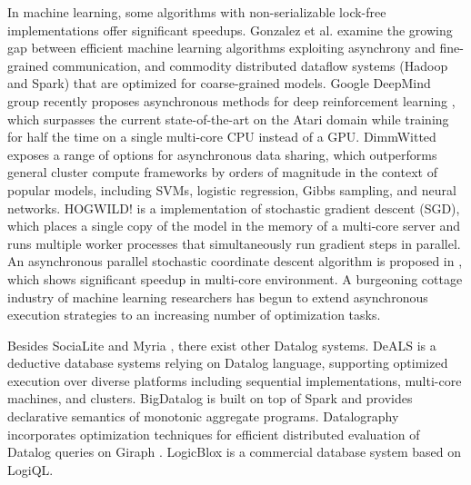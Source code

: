  In machine learning, some algorithms with non-serializable lock-free implementations offer significant speedups. Gonzalez et al. \cite{DBLP:journals/corr/GonzalezBJFHGS15} examine the growing gap between efficient machine learning algorithms exploiting asynchrony and fine-grained communication, and commodity distributed dataflow systems (Hadoop and Spark) that are optimized for coarse-grained models. Google DeepMind group recently proposes asynchronous methods for deep reinforcement learning \cite{Mnih:2016:AMD:3045390.3045594}, which surpasses the current state-of-the-art on the Atari domain while training for half the time on a single multi-core CPU instead of a GPU. DimmWitted \cite{Zhang:2014:DSM:2732977.2733001} exposes a range of options for asynchronous data sharing, which outperforms general cluster compute frameworks by orders of magnitude in the context of popular models, including SVMs, logistic regression, Gibbs sampling, and neural networks. HOGWILD! \cite{Niu:2011:HLA:2986459.2986537} is a implementation of stochastic gradient descent (SGD), which places a single copy of the model in the memory of a multi-core server and runs multiple worker processes that simultaneously run gradient steps in parallel. An asynchronous parallel stochastic coordinate descent algorithm is proposed in \cite{Liu:2015:APS:2789272.2789282}, which shows significant speedup in multi-core environment. A burgeoning cottage industry of machine learning researchers has begun to extend asynchronous execution strategies to an increasing number of optimization tasks.

Besides SociaLite \cite{Lam:2013:SDE:2510649.2511289,Seo:2013:DSD:2556549.2556572} and Myria \cite{Halperin:2014:DMB:2588555.2594530,Wang:2015:AFR:2824032.2824052}, there exist other Datalog systems. DeALS \cite{Shkapsky:2013:GQN:2536274.2536290,7113340} is a deductive database systems relying on Datalog language, supporting optimized execution over diverse platforms including sequential implementations, multi-core machines, and clusters. BigDatalog \cite{Shkapsky:2016:BDA:2882903.2915229} is built on top of Spark \cite{Zaharia:2010:SCC:1863103.1863113} and provides declarative semantics of monotonic aggregate programs. Datalography \cite{7840589} incorporates optimization techniques for efficient distributed evaluation of Datalog queries on Giraph \cite{giraph}. LogicBlox \cite{Aref:2015:DIL:2723372.2742796} is a commercial database system based on LogiQL.



